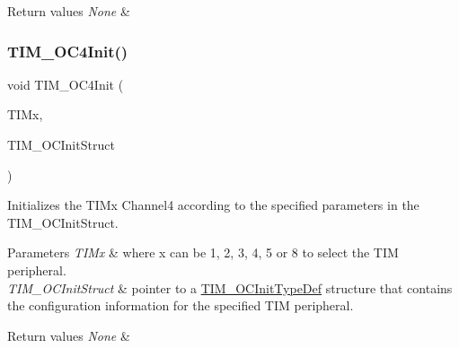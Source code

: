 \begin{DoxyRetVals}{Return values}
{\em None} & \\
\hline
\end{DoxyRetVals}
\mbox{\label{group___t_i_m___exported___functions_ga64571ebbb58cac39a9e760050175f11c}} 
\subsubsection{\texorpdfstring{TIM\_OC4Init()}{TIM\_OC4Init()}}
{\footnotesize\ttfamily void T\+I\+M\+\_\+\+O\+C4\+Init (\begin{DoxyParamCaption}\item[{\mbox{\hyperlink{struct_t_i_m___type_def}{T\+I\+M\+\_\+\+Type\+Def}} $\ast$}]{T\+I\+Mx,  }\item[{\mbox{\hyperlink{struct_t_i_m___o_c_init_type_def}{T\+I\+M\+\_\+\+O\+C\+Init\+Type\+Def}} $\ast$}]{T\+I\+M\+\_\+\+O\+C\+Init\+Struct }\end{DoxyParamCaption})}



Initializes the T\+I\+Mx Channel4 according to the specified parameters in the T\+I\+M\+\_\+\+O\+C\+Init\+Struct. 


\begin{DoxyParams}{Parameters}
{\em T\+I\+Mx} & where x can be 1, 2, 3, 4, 5 or 8 to select the T\+IM peripheral. \\
\hline
{\em T\+I\+M\+\_\+\+O\+C\+Init\+Struct} & pointer to a \mbox{\hyperlink{struct_t_i_m___o_c_init_type_def}{T\+I\+M\+\_\+\+O\+C\+Init\+Type\+Def}} structure that contains the configuration information for the specified T\+IM peripheral. \\
\hline
\end{DoxyParams}

\begin{DoxyRetVals}{Return values}
{\em None} & \\
\hline
\end{DoxyRetVals}
\mbox{\label{group___t_i_m___exported___functions_gad678410f7c7244f83daad93ce9d1056e}} 
